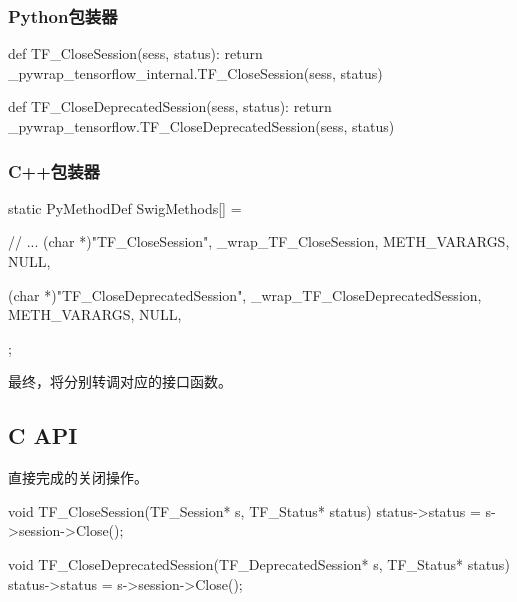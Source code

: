 \begin{content}
\subsubsection{Python包装器}

\begin{leftbar}
\begin{python}[caption={tensorflow/bazel-bin/tensorflow/python/pywrap\_tensorflow\_internal.py}]
def TF_CloseSession(sess, status):
    return _pywrap_tensorflow_internal.TF_CloseSession(sess, status)

def TF_CloseDeprecatedSession(sess, status):
  return _pywrap_tensorflow.TF_CloseDeprecatedSession(sess, status)
\end{python}
\end{leftbar}

\subsubsection{C++包装器}

\begin{leftbar}
\begin{c++}[caption={tensorflow/bazel-bin/tensorflow/python/pywrap\_tensorflow\_internal.cc}]
static PyMethodDef SwigMethods[] = {
  // ...
  { (char *)"TF_CloseSession", 
    _wrap_TF_CloseSession, METH_VARARGS, NULL},

  { (char *)"TF_CloseDeprecatedSession", 
    _wrap_TF_CloseDeprecatedSession, METH_VARARGS, NULL},
};
\end{c++}
\end{leftbar}

最终，将分别转调对应的接口函数。

\subsection{C API}

直接完成的关闭操作。

\begin{leftbar}
\begin{c++}[caption={tensorflow/c/c\_api.c}]
void TF_CloseSession(TF_Session* s, TF_Status* status) {
  status->status = s->session->Close();
}

void TF_CloseDeprecatedSession(TF_DeprecatedSession* s, TF_Status* status) {
  status->status = s->session->Close();
}
\end{c++}
\end{leftbar}


\end{content}
